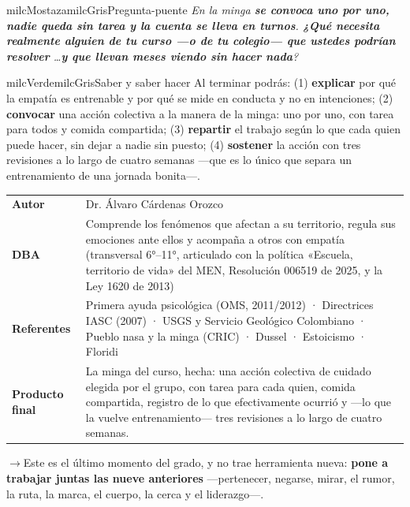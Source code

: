 \documentclass[11pt,letterpaper]{article}
\newcommand{\puente}[1]{%
  \begin{puentebox}%
    \textcolor{milcGradeDark}{$\rightarrow$}\hspace{2mm}#1%
  \end{puentebox}%
}
\begin{document}
\begin{softbox}{milcMostaza}{milcGris}{Pregunta-puente}
\textit{En la minga \textbf{se convoca uno por uno, nadie queda sin tarea y la cuenta se lleva en turnos}. \textbf{¿Qué necesita realmente alguien de tu curso ---o de tu colegio--- que ustedes podrían resolver} \ldots \textbf{y que llevan meses viendo sin hacer nada}?}
\end{softbox}

\begin{softbox}{milcVerde}{milcGris}{Saber y saber hacer}
Al terminar podrás: (1) \textbf{explicar} por qué la empatía es entrenable y por qué se mide en conducta y no en intenciones; (2) \textbf{convocar} una acción colectiva a la manera de la minga: uno por uno, con tarea para todos y comida compartida; (3) \textbf{repartir} el trabajo según lo que cada quien puede hacer, sin dejar a nadie sin puesto; (4) \textbf{sostener} la acción con tres revisiones a lo largo de cuatro semanas ---que es lo único que separa un entrenamiento de una jornada bonita---.
\end{softbox}



\small
\begin{tabularx}{\textwidth}{>{\bfseries}p{3.0cm}Y}
Autor & Dr. Álvaro Cárdenas Orozco\\
DBA & Comprende los fenómenos que afectan a su territorio, regula sus emociones ante ellos y acompaña a otros con empatía (transversal 6°--11°, articulado con la política «Escuela, territorio de vida» del MEN, Resolución 006519 de 2025, y la Ley 1620 de 2013)\\
Referentes & Primera ayuda psicológica (OMS, 2011/2012) · Directrices IASC (2007) · USGS y Servicio Geológico Colombiano · Pueblo nasa y la minga (CRIC) · Dussel · Estoicismo · Floridi\\
Producto final & La minga del curso, hecha: una acción colectiva de cuidado elegida por el grupo, con tarea para cada quien, comida compartida, registro de lo que efectivamente ocurrió y —lo que la vuelve entrenamiento— tres revisiones a lo largo de cuatro semanas.\\
\end{tabularx}
\normalsize

\puente{Este es el último momento del grado, y no trae herramienta nueva: \textbf{pone a trabajar juntas las nueve anteriores} ---pertenecer, negarse, mirar, el rumor, la ruta, la marca, el cuerpo, la cerca y el liderazgo---.}
\end{document}
